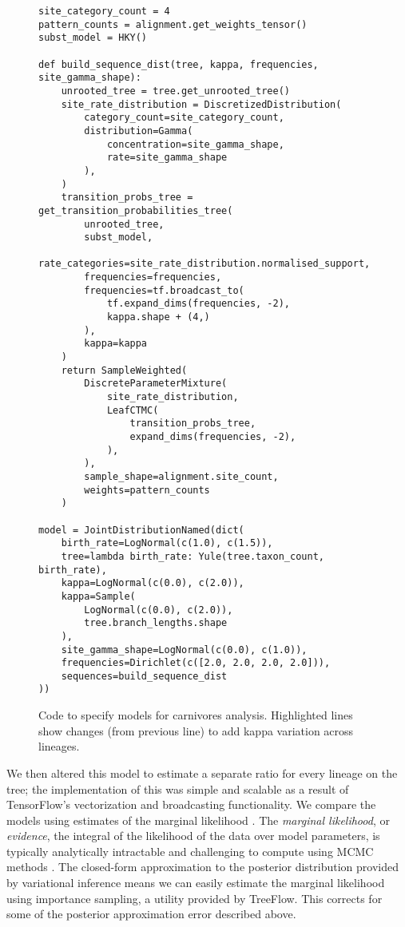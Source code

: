 \begin{figure}
    \begin{verbatim}
site_category_count = 4
pattern_counts = alignment.get_weights_tensor()
subst_model = HKY()

def build_sequence_dist(tree, kappa, frequencies, site_gamma_shape):
    unrooted_tree = tree.get_unrooted_tree()
    site_rate_distribution = DiscretizedDistribution(
        category_count=site_category_count,
        distribution=Gamma(
            concentration=site_gamma_shape,
            rate=site_gamma_shape
        ),
    )
    transition_probs_tree = get_transition_probabilities_tree(
        unrooted_tree,
        subst_model,
        rate_categories=site_rate_distribution.normalised_support,
        frequencies=frequencies,
        frequencies=tf.broadcast_to(
            tf.expand_dims(frequencies, -2),
            kappa.shape + (4,)
        ),
        kappa=kappa
    )
    return SampleWeighted(
        DiscreteParameterMixture(
            site_rate_distribution,
            LeafCTMC(
                transition_probs_tree,
                expand_dims(frequencies, -2),
            ),
        ),
        sample_shape=alignment.site_count,
        weights=pattern_counts
    )

model = JointDistributionNamed(dict(
    birth_rate=LogNormal(c(1.0), c(1.5)),
    tree=lambda birth_rate: Yule(tree.taxon_count, birth_rate),
    kappa=LogNormal(c(0.0), c(2.0)),
    kappa=Sample(
        LogNormal(c(0.0), c(2.0)),
        tree.branch_lengths.shape
    ),
    site_gamma_shape=LogNormal(c(0.0), c(1.0)),
    frequencies=Dirichlet(c([2.0, 2.0, 2.0, 2.0])),
    sequences=build_sequence_dist
))
    \end{verbatim}
    \label{fig:carnivorescode}
    \caption{Code to specify models for carnivores analysis. Highlighted lines show changes (from previous line) to add kappa variation across lineages.}
\end{figure}

We then altered this model to estimate a separate ratio for every lineage on the tree; the implementation of this was simple and scalable as a result of TensorFlow's vectorization and broadcasting functionality. We compare the models using estimates of the marginal likelihood \cite{mackay2003information}. The \textit{marginal likelihood}, or \textit{evidence}, the integral of the likelihood of the data over model parameters, is typically analytically intractable and challenging to compute using MCMC methods \cite{xie2011improving}. The closed-form approximation to the posterior distribution provided by variational inference means we can easily estimate the marginal likelihood using importance sampling, a utility provided by TreeFlow. This corrects for some of the posterior approximation error described above.

